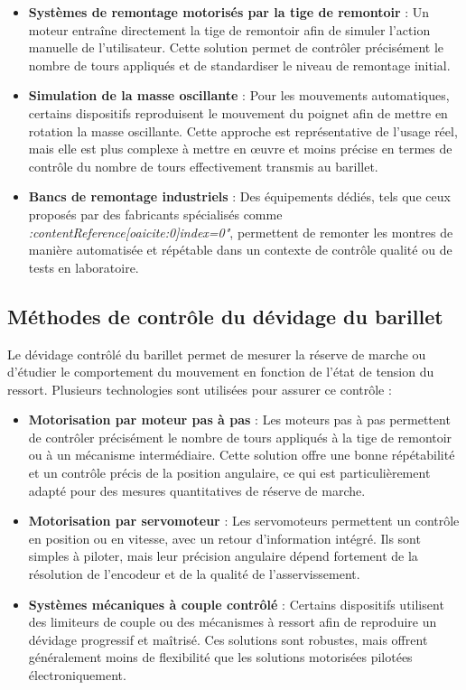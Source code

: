 \begin{itemize}
    \item \textbf{Systèmes de remontage motorisés par la tige de remontoir} :  
    Un moteur entraîne directement la tige de remontoir afin de simuler l’action manuelle de l’utilisateur. Cette solution permet de contrôler précisément le nombre de tours appliqués et de standardiser le niveau de remontage initial.

    \item \textbf{Simulation de la masse oscillante} :  
    Pour les mouvements automatiques, certains dispositifs reproduisent le mouvement du poignet afin de mettre en rotation la masse oscillante. Cette approche est représentative de l’usage réel, mais elle est plus complexe à mettre en œuvre et moins précise en termes de contrôle du nombre de tours effectivement transmis au barillet.

    \item \textbf{Bancs de remontage industriels} :  
    Des équipements dédiés, tels que ceux proposés par des fabricants spécialisés comme \textit{:contentReference[oaicite:0]{index=0}"}, permettent de remonter les montres de manière automatisée et répétable dans un contexte de contrôle qualité ou de tests en laboratoire.
\end{itemize}

\subsection{Méthodes de contrôle du dévidage du barillet}

Le dévidage contrôlé du barillet permet de mesurer la réserve de marche ou d’étudier le comportement du mouvement en fonction de l’état de tension du ressort. Plusieurs technologies sont utilisées pour assurer ce contrôle :

\begin{itemize}
    \item \textbf{Motorisation par moteur pas à pas} :  
    Les moteurs pas à pas permettent de contrôler précisément le nombre de tours appliqués à la tige de remontoir ou à un mécanisme intermédiaire. Cette solution offre une bonne répétabilité et un contrôle précis de la position angulaire, ce qui est particulièrement adapté pour des mesures quantitatives de réserve de marche.

    \item \textbf{Motorisation par servomoteur} :  
    Les servomoteurs permettent un contrôle en position ou en vitesse, avec un retour d’information intégré. Ils sont simples à piloter, mais leur précision angulaire dépend fortement de la résolution de l’encodeur et de la qualité de l’asservissement.

    \item \textbf{Systèmes mécaniques à couple contrôlé} :  
    Certains dispositifs utilisent des limiteurs de couple ou des mécanismes à ressort afin de reproduire un dévidage progressif et maîtrisé. Ces solutions sont robustes, mais offrent généralement moins de flexibilité que les solutions motorisées pilotées électroniquement.
\end{itemize}

